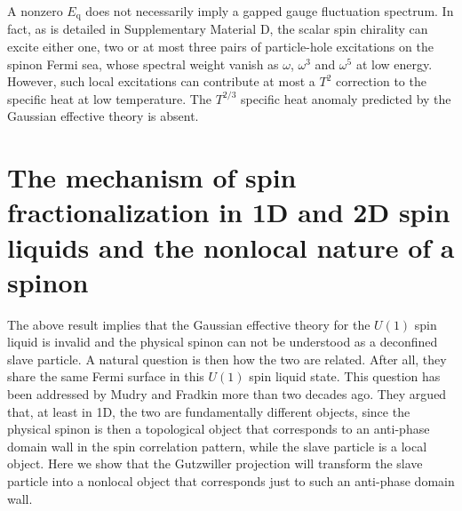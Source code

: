 \documentclass[12pt]{article}
\begin{document}
A nonzero $E_{\mathrm{q}}$ does not necessarily imply a gapped gauge fluctuation spectrum. In fact, as is detailed in Supplementary Material D, the scalar spin chirality can excite either one, two or at most three pairs of particle-hole excitations on the spinon Fermi sea, whose spectral weight vanish as $\omega$, $\omega^{3}$ and $\omega^{5}$ at low energy. However, such local excitations can contribute at most a $T^{2}$ correction to the specific heat at low temperature. The $T^{2/3}$ specific heat anomaly predicted by the Gaussian effective theory is absent. 

\section*{The mechanism of spin fractionalization in 1D and 2D spin liquids and the nonlocal nature of a spinon}
The above result implies that the Gaussian effective theory for the $U(1)$ spin liquid is invalid and the physical spinon can not be understood as a deconfined slave particle. A natural question is then how the two are related. After all, they share the same Fermi surface in this $U(1)$ spin liquid state. This question has been addressed by Mudry and Fradkin more than two decades ago\cite{Fradkin1,Fradkin2}. They argued that, at least in 1D, the two are fundamentally different objects, since the physical spinon is then a topological object that corresponds to an anti-phase domain wall in the spin correlation pattern, while the slave particle is a local object. Here we show that the Gutzwiller projection will transform the slave particle into a nonlocal object that corresponds just to such an anti-phase domain wall.
\end{document}

